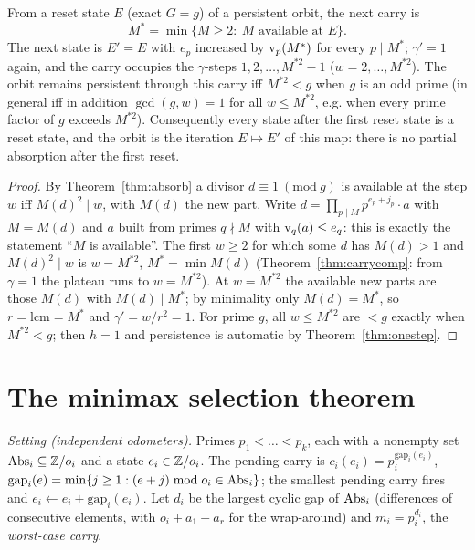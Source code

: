 \begin{theorem}\label{thm:predictor}
From a reset state \(E\) (exact \(G=g\)) of a persistent orbit, the next carry is
\[
M^\ast=\min\{M\ge2:\ M\text{ available at }E\}.
\]
The next state is \(E'=E\) with \(e_p\) increased by \(\operatorname{v}_p(M^\ast)\) for every \(p\mid M^\ast\); \(\gamma'=1\) again, and the carry occupies the \(\gamma\)-steps \(1,2,\dots,M^{\ast2}-1\) (\(w=2,\dots,M^{\ast2}\)). The orbit remains persistent through this carry iff \(M^{\ast2}<g\) when \(g\) is an odd prime (in general iff in addition \(\gcd(g,w)=1\) for all \(w\le M^{\ast2}\), e.g. when every prime factor of \(g\) exceeds \(M^{\ast2}\)). Consequently every state after the first reset state is a reset state, and the orbit is the iteration \(E\mapsto E'\) of this map: there is no partial absorption after the first reset.
\end{theorem}
\begin{proof}
By Theorem~\ref{thm:absorb} a divisor \(d\equiv1\ (\mathrm{mod}\ g)\) is available at the step \(w\) iff \(M(d)^2\mid w\), with \(M(d)\) the new part. Write \(d=\prod_{p\mid M}p^{e_p+j_p}\cdot a\) with \(M=M(d)\) and \(a\) built from primes \(q\nmid M\) with \(\operatorname{v}_q(a)\le e_q\): this is exactly the statement ``\(M\) is available''. The first \(w\ge2\) for which some \(d\) has \(M(d)>1\) and \(M(d)^2\mid w\) is \(w=M^{\ast2}\), \(M^\ast=\min M(d)\) (Theorem~\ref{thm:carrycomp}: from \(\gamma=1\) the plateau runs to \(w=M^{\ast2}\)). At \(w=M^{\ast2}\) the available new parts are those \(M(d)\) with \(M(d)\mid M^\ast\); by minimality only \(M(d)=M^\ast\), so \(r=\mathrm{lcm}=M^\ast\) and \(\gamma'=w/r^2=1\). For prime \(g\), all \(w\le M^{\ast2}\) are \(<g\) exactly when \(M^{\ast2}<g\); then \(h=1\) and persistence is automatic by Theorem~\ref{thm:onestep}.
\end{proof}

\section{The minimax selection theorem}

\emph{Setting (independent odometers).} Primes \(p_1<\dots<p_k\), each with a nonempty set \(\operatorname{Abs}_i\subseteq\mathbb{Z}/o_i\) and a state \(e_i\in\mathbb{Z}/o_i\). The pending carry is \(c_i(e_i)=p_i^{\mathrm{gap}_i(e_i)}\), \(\mathrm{gap}_i(e)=\min\{j\ge1:(e+j)\bmod o_i\in\operatorname{Abs}_i\}\); the smallest pending carry fires and \(e_i\leftarrow e_i+\mathrm{gap}_i(e_i)\). Let \(d_i\) be the largest cyclic gap of \(\operatorname{Abs}_i\) (differences of consecutive elements, with \(o_i+a_1-a_r\) for the wrap-around) and \(m_i=p_i^{d_i}\), the \emph{worst-case carry}.

